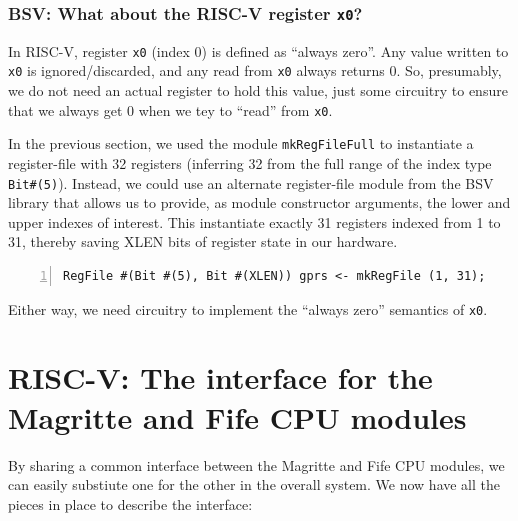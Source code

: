 
\subsubsection{BSV: What about the RISC-V register {\tt x0}?}


In RISC-V, register \verb|x0| (index 0) is defined as ``always zero''.
Any value written to \verb|x0| is ignored/discarded, and any read from
\verb|x0| always returns 0.  So, presumably, we do not need an actual
register to hold this value, just some circuitry to ensure that we
always get 0 when we tey to ``read'' from \verb|x0|.

In the previous section, we used the module \verb|mkRegFileFull| to
instantiate a register-file with 32 registers (inferring 32 from the
full range of the index type \verb|Bit#(5)|).  Instead, we could use
an alternate register-file module from the BSV library that allows us
to provide, as module constructor arguments, the lower and upper
indexes of interest.  This instantiate exactly 31 registers indexed
from 1 to 31, thereby saving XLEN bits of register state in our
hardware.

\begin{Verbatim}[frame=single, numbers=left]
   RegFile #(Bit #(5), Bit #(XLEN)) gprs <- mkRegFile (1, 31);
\end{Verbatim}

Either way, we need circuitry to implement the ``always zero''
semantics of \verb|x0|.


\section{RISC-V: The interface for the Magritte and Fife CPU modules}

\label{Sec_Magritte_Fetch_Decode_CPU_interface}

By sharing a common interface between the Magritte and Fife CPU
modules, we can easily substiute one for the other in the overall
system.  We now have all the pieces in place to describe the interface:

 

